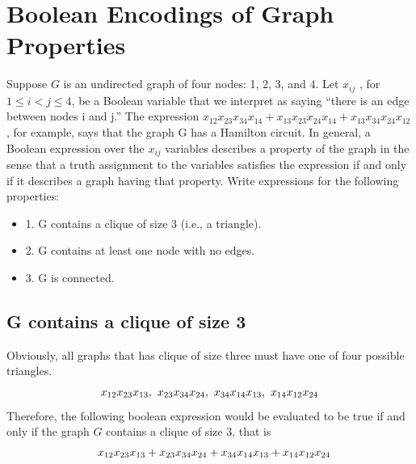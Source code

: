 \documentclass[11pt,a4paper]{article}
\newcommand{\htab}{\hspace*{0.63cm}}
\begin{document}
\section{Boolean Encodings of Graph Properties}
Suppose $G$ is an undirected graph of four nodes: 1, 2, 3, and 4. Let $x_{ij}$ , for $1 \leq i < j \leq 4$,
be a Boolean variable that we interpret as saying “there is an edge between nodes i and j.”
The expression $x_{12}x_{23}x_{34}x_{14} + x_{13}x_{23}x_{24}x_{14}+x_{13}x_{34}x_{24}x_{12}$, for example, 
says that the graph G has a Hamilton circuit. In general, a Boolean expression over 
the $x_{ij}$ variables describes a property of the graph in the sense that a truth assignment
to the variables satisfies the expression if and only if it describes a graph having 
that property. Write expressions for the following properties:
\begin{itemize}
    \item{1. G contains a clique of size 3 (i.e., a triangle). }
    \item{2. G contains at least one node with no edges. }
    \item{3. G is connected.}
\end{itemize}
\subsection{G contains a clique of size 3}
\htab Obviously, all graphs that has clique of size three must have one of four possible triangles. \\
\begin{align}
    x_{12}x_{23}x_{13} ,\
    x_{23}x_{34}x_{24} ,\  
    x_{34}x_{14}x_{13} ,\
    x_{14}x_{12}x_{24} 
\end{align}
\htab Therefore, the following boolean expression would be evaluated to be true
if and only if the graph $G$ contains a clique of size 3, that is
\begin{equation}
\begin{aligned}
    &\htab    \x{12}\x{23}\x{13} +
    \x{23}\x{34}\x{24}  + 
    \x{34}\x{14}\x{13} + 
    \x{14}\x{12}\x{24} \end{aligned}
\end{equation}
\end{document}
